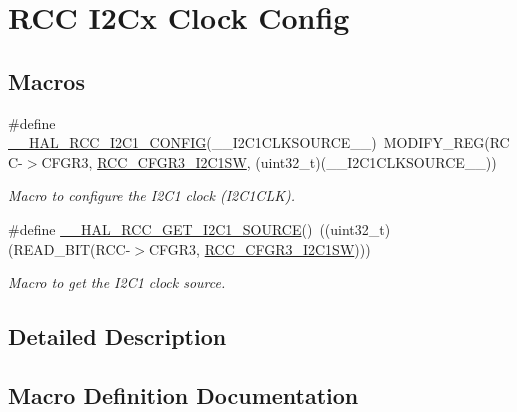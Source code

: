 \hypertarget{group___r_c_c___i2_cx___clock___config}{}\section{R\+CC I2\+Cx Clock Config}
\label{group___r_c_c___i2_cx___clock___config}
\subsection*{Macros}
\begin{DoxyCompactItemize}
\item 
\#define \hyperlink{group___r_c_c___i2_cx___clock___config_gaa6b4549872ed37d14913c6e0bd91a671}{\+\_\+\+\_\+\+H\+A\+L\+\_\+\+R\+C\+C\+\_\+\+I2\+C1\+\_\+\+C\+O\+N\+F\+IG}(\+\_\+\+\_\+\+I2\+C1\+C\+L\+K\+S\+O\+U\+R\+C\+E\+\_\+\+\_\+)~M\+O\+D\+I\+F\+Y\+\_\+\+R\+EG(R\+CC-\/$>$C\+F\+G\+R3, \hyperlink{group___peripheral___registers___bits___definition_gae5a2d49d45df299ff751fb904570d070}{R\+C\+C\+\_\+\+C\+F\+G\+R3\+\_\+\+I2\+C1\+SW}, (uint32\+\_\+t)(\+\_\+\+\_\+\+I2\+C1\+C\+L\+K\+S\+O\+U\+R\+C\+E\+\_\+\+\_\+))
\begin{DoxyCompactList}\small\item\em Macro to configure the I2\+C1 clock (I2\+C1\+C\+LK). \end{DoxyCompactList}\item 
\#define \hyperlink{group___r_c_c___i2_cx___clock___config_gab9372aa811e622a602d2b3657790c8e7}{\+\_\+\+\_\+\+H\+A\+L\+\_\+\+R\+C\+C\+\_\+\+G\+E\+T\+\_\+\+I2\+C1\+\_\+\+S\+O\+U\+R\+CE}()~((uint32\+\_\+t)(R\+E\+A\+D\+\_\+\+B\+IT(R\+CC-\/$>$C\+F\+G\+R3, \hyperlink{group___peripheral___registers___bits___definition_gae5a2d49d45df299ff751fb904570d070}{R\+C\+C\+\_\+\+C\+F\+G\+R3\+\_\+\+I2\+C1\+SW})))
\begin{DoxyCompactList}\small\item\em Macro to get the I2\+C1 clock source. \end{DoxyCompactList}\end{DoxyCompactItemize}


\subsection{Detailed Description}


\subsection{Macro Definition Documentation}
\mbox{\label{group___r_c_c___i2_cx___clock___config_gab9372aa811e622a602d2b3657790c8e7}} 
